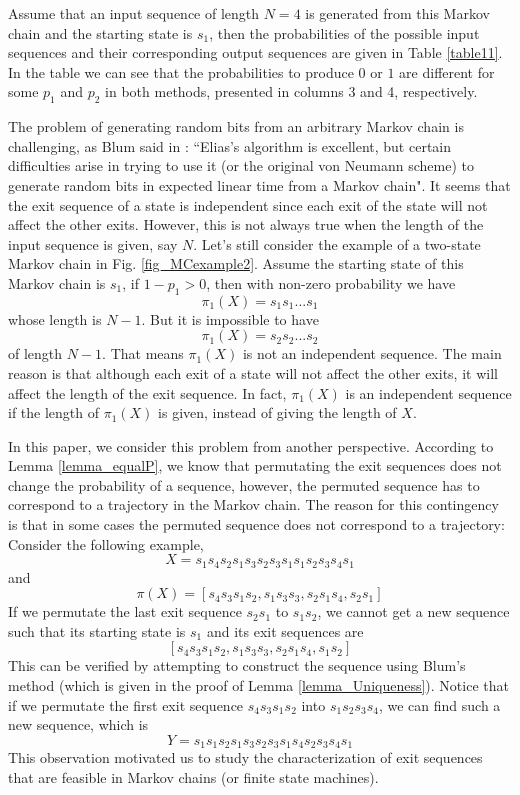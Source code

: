 \documentclass[journal]{IEEEtran}
\begin{document}
Assume that an input sequence of length $N=4$ is generated from this Markov chain and the starting state is $s_1$, then the probabilities of the possible input sequences and their corresponding output sequences are given in Table \ref{table11}. In the table we can see that the probabilities to produce $0$ or $1$ are different for some $p_1$ and $p_2$ in both methods, presented in columns 3 and 4, respectively.


The problem of generating random bits from an arbitrary Markov chain is challenging, as Blum said in \cite{Blum1986}: ``Elias's algorithm is excellent, but certain difficulties arise in trying to use it (or the original von Neumann scheme) to generate random bits in expected linear time from a Markov chain". It seems that the exit sequence of a state is independent since each exit of the state will not affect the other exits. However, this is not always true
when the length of the input sequence is given, say $N$. Let's still consider the example of
a two-state Markov chain in Fig. \ref{fig_MCexample2}. Assume the starting state of this Markov chain is $s_1$, if $1-p_1>0$, then with non-zero probability we have
$$\pi_1(X)=s_1s_1...s_1$$
whose length is $N-1$. But it is impossible to have
$$\pi_1(X)=s_2s_2...s_2$$
of length $N-1$. That means $\pi_1(X)$ is not an independent sequence. The main reason is that
although each exit of a state will not affect the other exits, it will affect the length of the exit sequence.
In fact, $\pi_1(X)$ is an independent sequence if the length of $\pi_1(X)$ is given, instead of giving the length of $X$.

In this paper, we consider this problem from another perspective. According to Lemma \ref{lemma_equalP}, we know that permutating the exit sequences does not change the probability of a sequence, however, the permuted sequence has to correspond to a trajectory in the Markov chain. The reason for this contingency is that in some cases the permuted sequence does not correspond to a trajectory: Consider the following example,
$$X=s_1 s_4 s_2 s_1 s_3 s_2 s_3 s_1 s_1 s_2 s_3 s_4 s_1$$
and
$$\pi(X)=[s_4 s_3 s_1s_2,s_1 s_3 s_3,s_2s_1 s_4, s_2 s_1]$$
If we permutate the last exit sequence $s_2s_1$ to $s_1s_2$, we cannot get a new sequence such that
its starting state is $s_1$ and its exit sequences are
$$[s_4 s_3 s_1s_2,s_1 s_3 s_3,s_2s_1 s_4, s_1 s_2]$$
This can be verified by attempting to construct the sequence using
Blum's method (which is given in the proof of Lemma \ref{lemma_Uniqueness}).
Notice that if we permutate the first exit sequence $s_4s_3s_1s_2$ into $s_1s_2s_3s_4$, we can find such a new sequence, which is
$$Y=s_1s_1s_2s_1s_3s_2s_3s_1s_4s_2s_3s_4s_1$$
This observation motivated us to study
the characterization of exit sequences that are feasible in Markov chains (or finite state machines).
\end{document}
